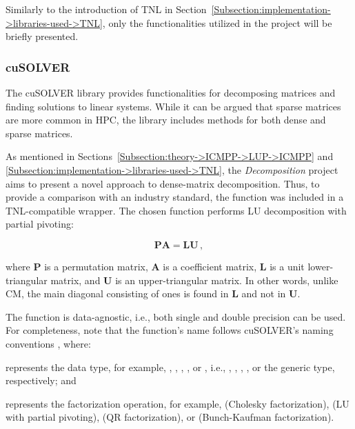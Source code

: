 Similarly to the introduction of TNL in Section~\ref{Subsection:implementation->libraries-used->TNL}, only the functionalities utilized in the project will be briefly presented.

\subsubsection{cuSOLVER}\label{Subsection:implementation->libraries-used->CUDA-libraries->cuSOLVER}
The cuSOLVER library provides functionalities for decomposing matrices and finding solutions to linear systems.
While it can be argued that sparse matrices are more common in HPC, the library includes methods for both dense and sparse matrices.

As mentioned in Sections~\ref{Subsection:theory->ICMPP->LUP->ICMPP} and \ref{Subsection:implementation->libraries-used->TNL}, the \textit{Decomposition} project aims to present a novel approach to dense-matrix decomposition.
Thus, to provide a comparison with an industry standard, the  function was included in a TNL-compatible wrapper.
The chosen function performs LU decomposition with partial pivoting:

\begin{equation}
	\mathbf{PA} = \mathbf{LU} \,,
\end{equation}

where $\mathbf{P}$ is a permutation matrix, $\mathbf{A}$ is a coefficient matrix, $\mathbf{L}$ is a unit lower-triangular matrix, and $\mathbf{U}$ is an upper-triangular matrix.
In other words, unlike CM, the main diagonal consisting of ones is found in $\mathbf{L}$ and not in $\mathbf{U}$.

The function is data-agnostic, i.e., both single and double precision can be used.
For completeness, note that the function's name follows cuSOLVER's naming conventions  \cite{5D33zKi5iStCty0r}, where:

\begin{tight_itemize}
	\item {} represents the data type, for example, , , , , or , i.e., , , , , or the generic type, respectively; and
	\item {} represents the factorization operation, for example,  (Cholesky factorization),  (LU with partial pivoting),  (QR factorization), or  (Bunch-Kaufman factorization).
\end{tight_itemize}


